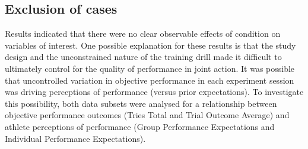 





\subsection{Exclusion of cases}
Results indicated that there were no clear observable effects of condition on variables of interest.  One possible explanation for these results is that the study design and the unconstrained nature of the training drill made it difficult to ultimately control for the quality of performance in joint action.  It was possible that uncontrolled variation in objective performance in each experiment session was driving perceptions of performance (versus prior expectations).  To investigate this possibility, both data subsets were analysed for a relationship between objective performance outcomes (Tries Total and Trial Outcome Average) and athlete perceptions of performance (Group Performance Expectations and Individual Performance Expectations).

